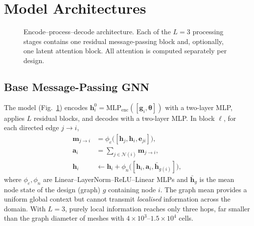 \documentclass[journal]{IEEEtran}
\begin{document}
\section{Model Architectures}
\label{sec:models}
\begin{figure}[!t]
\centering
{}
\caption{Encode--process--decode architecture. Each of the $L=3$ processing
stages contains one residual message-passing block and, optionally, one latent
attention block. All attention is computed separately per design.}
\label{fig:arch}
\end{figure}

\subsection{Base Message-Passing GNN}
The model (Fig.~\ref{fig:arch}) encodes
$\mathbf{h}^0_i=\mathrm{MLP}_\mathrm{enc}([\mathbf{g}_i,\boldsymbol{\theta}])$
with a two-layer MLP, applies $L$ residual blocks, and decodes with a two-layer
MLP. In block $\ell$, for each directed edge $j\!\to\!i$,
\begin{align}
\mathbf{m}_{j\to i}&=\phi_e\big([\mathbf{h}_j,\mathbf{h}_i,\mathbf{e}_{ji}]\big),\\
\mathbf{a}_i&=\textstyle\sum_{j\in\mathcal{N}(i)}\mathbf{m}_{j\to i},\\
\mathbf{h}_i&\leftarrow\mathbf{h}_i+\phi_n\big([\mathbf{h}_i,\mathbf{a}_i,\bar{\mathbf{h}}_{g(i)}]\big),
\end{align}
where $\phi_e,\phi_n$ are Linear--LayerNorm--ReLU--Linear MLPs and
$\bar{\mathbf{h}}_{g}$ is the mean node state of the design (graph) $g$
containing node $i$. The graph mean provides a uniform global context but
cannot transmit \emph{localised} information across the domain. With
$L=3$, purely local information reaches only three hops, far smaller than the
graph diameter of meshes with $4\times10^3$--$1.5\times10^4$ cells.
\end{document}
